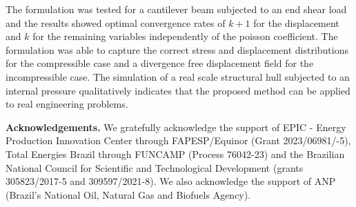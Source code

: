 \documentclass{wccm2024}
\begin{document}
The formulation was tested for a cantilever beam subjected to an end shear load and the results showed optimal convergence rates of $k+1$ for the displacement and $k$ for the remaining variables independently of the poisson coefficient. The formulation was able to capture the correct stress and displacement distributions for the compressible case and a divergence free displacement field for the incompressible case. The simulation of a real scale structural hull subjected to an internal pressure qualitatively indicates that the proposed method can be applied to real engineering problems.

\vspace{20pt}
\noindent \textbf{Acknowledgements.} We gratefully acknowledge the support of EPIC - Energy Production Innovation Center through FAPESP/Equinor (Grant 2023/06981/-5),  Total Energies Brazil through FUNCAMP (Process 76042-23) and the Brazilian National Council for Scientific and Technological Development (grants 305823/2017-5 and 309597/2021-8). We also acknowledge the support of ANP (Brazil’s National Oil, Natural Gas and Biofuels Agency).
\vspace{12pt}



\end{document}
